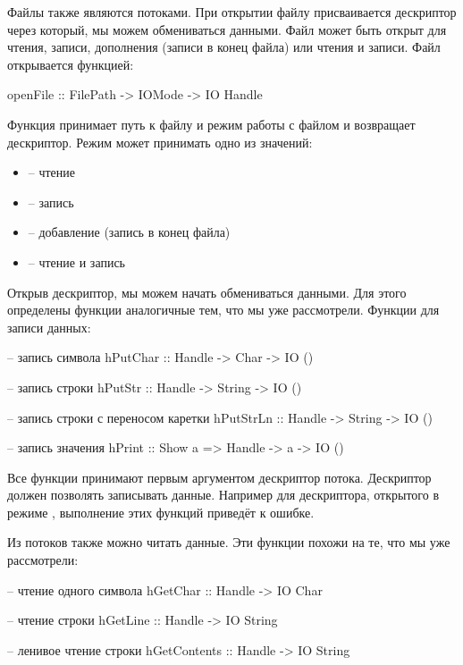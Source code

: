 Файлы также являются потоками. При открытии файлу
присваивается дескриптор через который, мы можем обмениваться 
данными. Файл может быть открыт для чтения, записи, 
дополнения (записи в конец файла) или чтения и записи. 
Файл открывается функцией:

\begin{code}
openFile :: FilePath -> IOMode -> IO Handle
\end{code}

Функция принимает путь к файлу и режим работы с файлом
и возвращает дескриптор. Режим может принимать одно из значений:

\begin{itemize}
\item {}         -- чтение
\item {}        -- запись
\item {}       -- добавление (запись в конец файла)
\item {}    -- чтение и запись
\end{itemize}

Открыв дескриптор, мы можем начать обмениваться данными.
Для этого определены функции аналогичные тем, что мы уже
рассмотрели. Функции для записи данных:

\begin{code}
-- запись символа
hPutChar :: Handle -> Char -> IO ()

-- запись строки
hPutStr :: Handle -> String -> IO ()

-- запись строки с переносом каретки
hPutStrLn :: Handle -> String -> IO ()

-- запись значения
hPrint :: Show a => Handle -> a -> IO ()
\end{code}

Все функции принимают первым аргументом дескриптор потока. 
Дескриптор должен позволять записывать данные. Например
для дескриптора, открытого в режиме , выполнение
этих функций приведёт к ошибке.

Из потоков также можно читать данные. Эти функции похожи 
на те, что мы уже рассмотрели:

\begin{code}
-- чтение одного символа
hGetChar :: Handle -> IO Char

-- чтение строки
hGetLine :: Handle -> IO String

-- ленивое чтение строки
hGetContents :: Handle -> IO String
\end{code}


